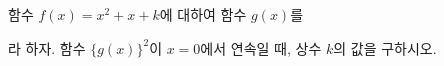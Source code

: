 함수 $f(x)=x^2+x+k$에 대하여 함수 $g(x)$를 \par\smallskip{}\par\smallskip\noindent 라 하자. 함수 $\{g(x)\}^2$이 $x=0$에서 연속일 때, 상수 $k$의 값을 구하시오.
